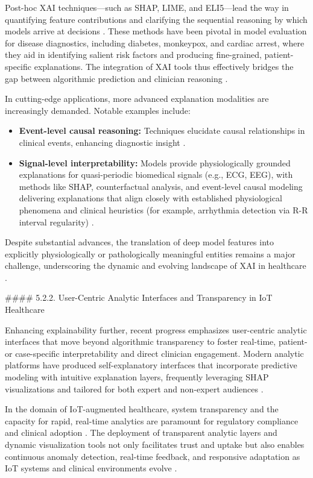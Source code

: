 \documentclass[11pt]{article}
\begin{document}
Post-hoc XAI techniques—such as SHAP, LIME, and ELI5—lead the way in quantifying feature contributions and clarifying the sequential reasoning by which models arrive at decisions \cite{ref11,ref28,ref36,ref50,ref65}. These methods have been pivotal in model evaluation for disease diagnostics, including diabetes, monkeypox, and cardiac arrest, where they aid in identifying salient risk factors and producing fine-grained, patient-specific explanations. The integration of XAI tools thus effectively bridges the gap between algorithmic prediction and clinician reasoning \cite{ref11,ref28,ref32,ref36,ref39,ref50,ref65,ref98}.

In cutting-edge applications, more advanced explanation modalities are increasingly demanded. Notable examples include:
\begin{itemize}
    \item \textbf{Event-level causal reasoning:} Techniques elucidate causal relationships in clinical events, enhancing diagnostic insight \cite{ref36,ref39}.
    \item \textbf{Signal-level interpretability:} Models provide physiologically grounded explanations for quasi-periodic biomedical signals (e.g., ECG, EEG), with methods like SHAP, counterfactual analysis, and event-level causal modeling delivering explanations that align closely with established physiological phenomena and clinical heuristics (for example, arrhythmia detection via R-R interval regularity) \cite{ref36,ref68,ref39,ref98,ref99}.
\end{itemize}
Despite substantial advances, the translation of deep model features into explicitly physiologically or pathologically meaningful entities remains a major challenge, underscoring the dynamic and evolving landscape of XAI in healthcare \cite{ref98,ref99}.

#### 5.2.2. User-Centric Analytic Interfaces and Transparency in IoT Healthcare

Enhancing explainability further, recent progress emphasizes user-centric analytic interfaces that move beyond algorithmic transparency to foster real-time, patient- or case-specific interpretability and direct clinician engagement. Modern analytic platforms have produced self-explanatory interfaces that incorporate predictive modeling with intuitive explanation layers, frequently leveraging SHAP visualizations and tailored for both expert and non-expert audiences \cite{ref87,ref89,ref99,ref106}.

In the domain of IoT-augmented healthcare, system transparency and the capacity for rapid, real-time analytics are paramount for regulatory compliance and clinical adoption \cite{ref90,ref106}. The deployment of transparent analytic layers and dynamic visualization tools not only facilitates trust and uptake but also enables continuous anomaly detection, real-time feedback, and responsive adaptation as IoT systems and clinical environments evolve \cite{ref87,ref99}.
\end{document}
